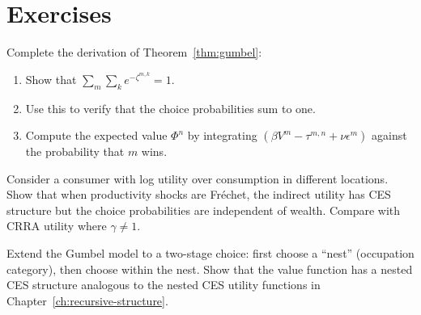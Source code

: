 \section{Exercises}
\label{sec:discrete-exercises}

\begin{callouttip}
Complete the derivation of Theorem~\ref{thm:gumbel}:
\begin{enumerate}[label=(\alph*)]
    \item Show that $\sum_m \sum_k e^{-\zeta^{m,k}} = 1$.
    \item Use this to verify that the choice probabilities sum to one.
    \item Compute the expected value $\Phi^n$ by integrating $(\beta V^m - \tau^{m,n} + \nu \epsilon^m)$ against the probability that $m$ wins.
\end{enumerate}
\end{callouttip}

\begin{callouttip}
Consider a consumer with log utility over consumption in different locations. Show that when productivity shocks are Fréchet, the indirect utility has CES structure but the choice probabilities are independent of wealth. Compare with CRRA utility where $\gamma \neq 1$.
\end{callouttip}

\begin{callouttip}
Extend the Gumbel model to a two-stage choice: first choose a ``nest'' (occupation category), then choose within the nest. Show that the value function has a nested CES structure analogous to the nested CES utility functions in Chapter~\ref{ch:recursive-structure}.
\end{callouttip}

